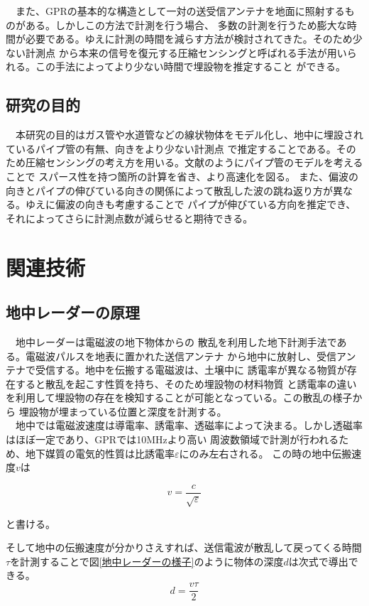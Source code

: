 \documentclass[a4paper,12pt]{jsreport}
\begin{document}
　また、GPRの基本的な構造として一対の送受信アンテナを地面に照射するものがある。しかしこの方法で計測を行う場合、
多数の計測を行うため膨大な時間が必要である。ゆえに計測の時間を減らす方法が検討されてきた。そのため少ない計測点
から本来の信号を復元する圧縮センシングと呼ばれる手法が用いられる。この手法によってより少ない時間で埋設物を推定すること
ができる。


\section{研究の目的}
　本研究の目的はガス管や水道管などの線状物体をモデル化し、地中に埋設されているパイプ管の有無、向きをより少ない計測点
で推定することである。そのため圧縮センシングの考え方を用いる。文献\cite{imai}のようにパイプ管のモデルを考えることで
スパース性を持つ箇所の計算を省き、より高速化を図る。
また、偏波の向きとパイプの伸びている向きの関係によって散乱した波の跳ね返り方が異なる。ゆえに偏波の向きも考慮することで
パイプが伸びている方向を推定でき、それによってさらに計測点数が減らせると期待できる。


\chapter{関連技術}
\section{地中レーダーの原理}
　地中レーダーは電磁波の地下物体からの
散乱を利用した地下計測手法である。電磁波パルスを地表に置かれた送信アンテナ
から地中に放射し、受信アンテナで受信する。地中を伝搬する電磁波は、土壌中に
誘電率が異なる物質が存在すると散乱を起こす性質を持ち、そのため埋設物の材料物質
と誘電率の違いを利用して埋設物の存在を検知することが可能となっている。この散乱の様子から
埋設物が埋まっている位置と深度を計測する。
\\　地中では電磁波速度は導電率、誘電率、透磁率によって決まる。しかし透磁率はほぼ一定であり、GPRでは10MHzより高い
周波数領域で計測が行われるため、地下媒質の電気的性質は比誘電率$\varepsilon$にのみ左右される。
この時の地中伝搬速度$v$は

\begin{equation}
  v =
  \frac{c}{\sqrt{\varepsilon}} 
  \end{equation}

と書ける。


そして地中の伝搬速度が分かりさえすれば、送信電波が散乱して戻ってくる時間
$\tau$を計測することで図\ref{地中レーダーの様子}のように物体の深度$d$は次式で導出できる。
\begin{equation}
  d=
  \frac{v \tau}{2} 
  \end{equation}
  
\end{document}
